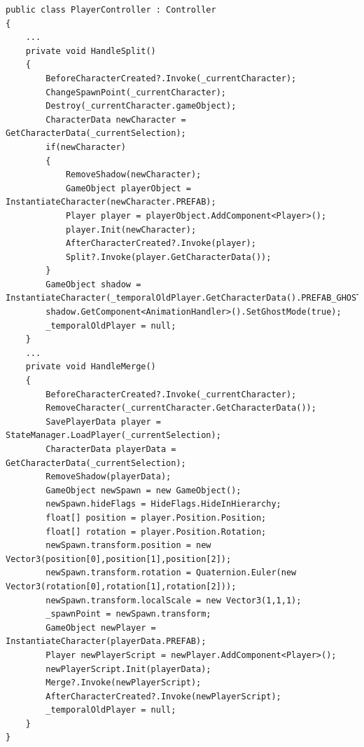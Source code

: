 \begin{lstlisting}[caption={Alte HandleSplit und HandleMerge Methode aus PlayerController.cs}, label={sec:split_merge_old}]
public class PlayerController : Controller
{
    ...
    private void HandleSplit()
    {
        BeforeCharacterCreated?.Invoke(_currentCharacter);
        ChangeSpawnPoint(_currentCharacter);
        Destroy(_currentCharacter.gameObject);
        CharacterData newCharacter = GetCharacterData(_currentSelection);
        if(newCharacter)
        {
            RemoveShadow(newCharacter);
            GameObject playerObject = InstantiateCharacter(newCharacter.PREFAB);
            Player player = playerObject.AddComponent<Player>();
            player.Init(newCharacter);
            AfterCharacterCreated?.Invoke(player);
            Split?.Invoke(player.GetCharacterData());
        }
        GameObject shadow = InstantiateCharacter(_temporalOldPlayer.GetCharacterData().PREFAB_GHOST);
        shadow.GetComponent<AnimationHandler>().SetGhostMode(true);
        _temporalOldPlayer = null;
    }
    ...
    private void HandleMerge()
    {
        BeforeCharacterCreated?.Invoke(_currentCharacter);
        RemoveCharacter(_currentCharacter.GetCharacterData());
        SavePlayerData player = StateManager.LoadPlayer(_currentSelection);
        CharacterData playerData = GetCharacterData(_currentSelection);
        RemoveShadow(playerData);
        GameObject newSpawn = new GameObject();
        newSpawn.hideFlags = HideFlags.HideInHierarchy;
        float[] position = player.Position.Position;
        float[] rotation = player.Position.Rotation;
        newSpawn.transform.position = new Vector3(position[0],position[1],position[2]);
        newSpawn.transform.rotation = Quaternion.Euler(new Vector3(rotation[0],rotation[1],rotation[2]));
        newSpawn.transform.localScale = new Vector3(1,1,1);
        _spawnPoint = newSpawn.transform;
        GameObject newPlayer = InstantiateCharacter(playerData.PREFAB);
        Player newPlayerScript = newPlayer.AddComponent<Player>();
        newPlayerScript.Init(playerData);
        Merge?.Invoke(newPlayerScript);
        AfterCharacterCreated?.Invoke(newPlayerScript);
        _temporalOldPlayer = null;
    }
}
\end{lstlisting}

